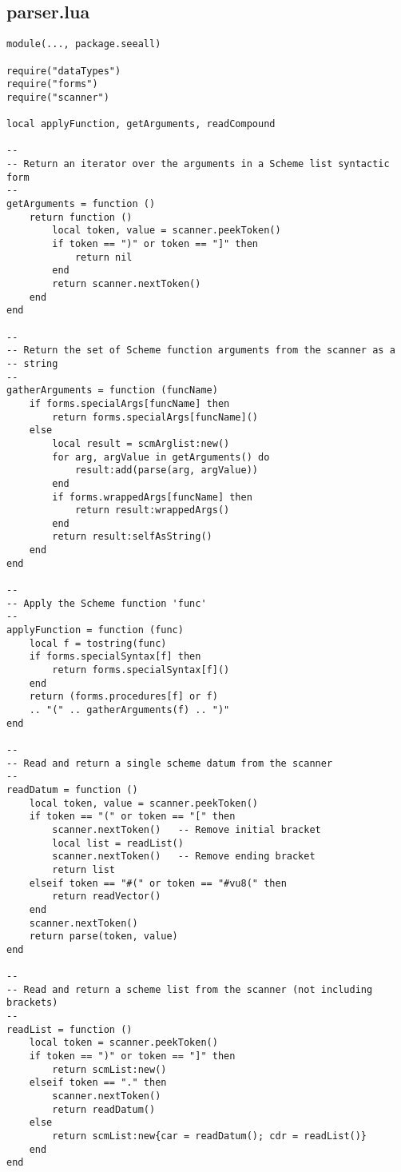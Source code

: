 \subsection{parser.lua}
\begin{verbatim}
module(..., package.seeall)

require("dataTypes")
require("forms")
require("scanner")

local applyFunction, getArguments, readCompound

--
-- Return an iterator over the arguments in a Scheme list syntactic form
--
getArguments = function ()
    return function ()
        local token, value = scanner.peekToken()
        if token == ")" or token == "]" then
            return nil
        end
        return scanner.nextToken()
    end
end

--
-- Return the set of Scheme function arguments from the scanner as a
-- string
--
gatherArguments = function (funcName)
    if forms.specialArgs[funcName] then
        return forms.specialArgs[funcName]()
    else
        local result = scmArglist:new()
        for arg, argValue in getArguments() do
            result:add(parse(arg, argValue))
        end
        if forms.wrappedArgs[funcName] then
            return result:wrappedArgs()
        end
        return result:selfAsString()
    end
end

--
-- Apply the Scheme function 'func'
--
applyFunction = function (func)
    local f = tostring(func)
    if forms.specialSyntax[f] then
        return forms.specialSyntax[f]()
    end
    return (forms.procedures[f] or f)
    .. "(" .. gatherArguments(f) .. ")"
end

--
-- Read and return a single scheme datum from the scanner
--
readDatum = function ()
    local token, value = scanner.peekToken()
    if token == "(" or token == "[" then
        scanner.nextToken()   -- Remove initial bracket
        local list = readList()
        scanner.nextToken()   -- Remove ending bracket
        return list
    elseif token == "#(" or token == "#vu8(" then
        return readVector()
    end
    scanner.nextToken()
    return parse(token, value)
end

--
-- Read and return a scheme list from the scanner (not including brackets)
--
readList = function ()
    local token = scanner.peekToken()
    if token == ")" or token == "]" then
        return scmList:new()
    elseif token == "." then
        scanner.nextToken()
        return readDatum()
    else
        return scmList:new{car = readDatum(); cdr = readList()}
    end
end


\end{verbatim}

